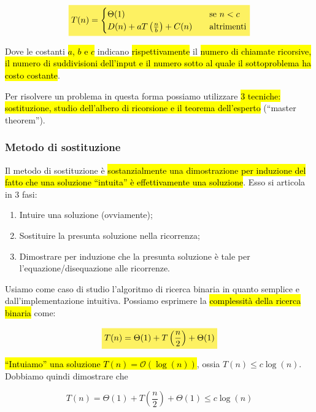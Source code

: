 \documentclass[a4paper,11pt,twoside]{article}
\theoremstyle{plain}
\theoremstyle{definition}
\theoremstyle{remark}
\newcommand{\mhl}[1]{\colorbox{hlcolor}{$\displaystyle #1$}}
\begin{document}
\begin{equation}
  \mhl{
    T(n) =
    \begin{cases}
      \Theta(1)                              & \quad \text{se } n < c \\
      D(n) + aT\left(\frac{n}{b}\right)+C(n) & \quad \text{altrimenti}
    \end{cases}
  }
\end{equation}

Dove le costanti \hl{$a$, $b$ e $c$} indicano \hl{rispettivamente} il \hl{numero
di chiamate ricorsive, il numero di suddivisioni dell'input e il numero sotto al
quale il sottoproblema ha costo costante}.

Per risolvere un problema in questa forma possiamo utilizzare \hl{3 tecniche:
sostituzione, studio dell'albero di ricorsione e il teorema dell'esperto}
(``master theorem'').

\subsubsection{Metodo di sostituzione}\label{sec:alg-ricorsivi-sost}

Il metodo di sostituzione è \hl{sostanzialmente una dimostrazione per induzione
del fatto che una soluzione ``intuita'' è effettivamente una soluzione}. Esso si
articola in 3 fasi:

\begin{enumerate}
  \item Intuire una soluzione (ovviamente);
  \item Sostituire la presunta soluzione nella ricorrenza;
  \item Dimostrare per induzione che la presunta soluzione è tale per
    l'equazione/disequazione alle ricorrenze.
\end{enumerate}

Usiamo come caso di studio l'algoritmo di ricerca binaria in quanto semplice e
dall'implementazione intuitiva. Possiamo esprimere la \hl{complessità della ricerca
binaria} come:

\begin{equation}
  \mhl{
    T(n) = \Theta(1) + T\left(\frac{n}{2}\right) + \Theta(1)
  }
\end{equation}

\hl{``Intuiamo'' una soluzione $T(n) = \mathcal{O}(\log(n))$}, ossia $T(n) \leq
c\log(n)$. Dobbiamo quindi dimostrare che

\begin{equation}
  T(n) = \Theta(1) + T\left(\frac{n}{2}\right) + \Theta(1) \leq c\log(n)
\end{equation}
\end{document}
